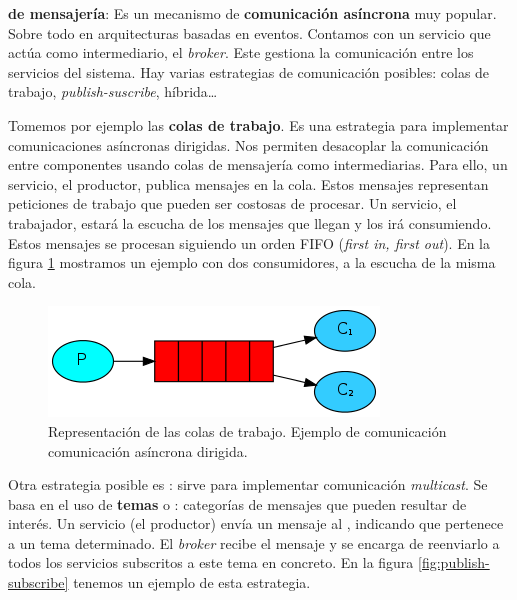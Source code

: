 \textbf{ de mensajería}: Es un mecanismo de \textbf{comunicación asíncrona} muy popular. Sobre todo en arquitecturas basadas en eventos. Contamos con un servicio que actúa como intermediario, el \emph{broker}. Este gestiona la comunicación entre los servicios del sistema. \cite{newmanBuildingMicroservicesDesigning2021} Hay varias estrategias de comunicación posibles: colas de trabajo, \emph{publish-suscribe}, híbrida\dots

Tomemos por ejemplo las \textbf{colas de trabajo}. \cite{royChapterMessagePatterns2017} Es una estrategia para implementar comunicaciones asíncronas dirigidas. Nos permiten desacoplar la comunicación entre componentes usando colas de mensajería como intermediarias. Para ello, un servicio, el productor, publica mensajes en la cola. Estos mensajes representan peticiones de trabajo que pueden ser costosas de procesar. Un servicio, el trabajador, estará la escucha de los mensajes que llegan y los irá consumiendo. Estos mensajes se procesan siguiendo un orden FIFO (\emph{first in, first out}). En la figura \ref{fig:work-queues} mostramos un ejemplo con dos consumidores, a la escucha de la misma cola.

\begin{figure}[htb]
  \centering
  \includegraphics[scale=0.65]{cap_arquitectura/images/work-queues}
  \caption[Representación de las colas de trabajo. Ejemplo de comunicación asíncrona dirigida.]{Representación de las colas de trabajo. Ejemplo de comunicación comunicación asíncrona dirigida. \footnotemark }
  \label{fig:work-queues}
\end{figure}


Otra estrategia posible es : sirve para implementar comunicación \emph{multicast}. Se basa en el uso de \textbf{temas} o \textbf{}: categorías de mensajes que pueden resultar de interés. Un servicio (el productor) envía un mensaje al , indicando que pertenece a un tema determinado. El \emph{broker} recibe el mensaje y se encarga de reenviarlo a todos los servicios subscritos a este tema en concreto. \cite{rabbitmqPublishSubscribeDocumentation} En la figura \ref{fig:publish-subscribe} tenemos un ejemplo de esta estrategia.

